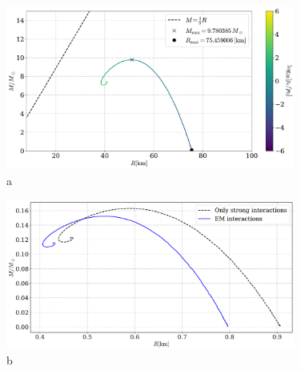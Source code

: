 \begin{figure}[!htb]
    \centering
    \includegraphics[width=0.85\textwidth]{../scripts/figurer/pion_star/mass_radius_pion_star_EM.pdf}
    \caption{a }
    \label{fig: mass radius relation leading order pion star with em interaction}
\end{figure}


\begin{figure}[!htb]
    \centering
    \includegraphics[width=0.85\textwidth]{../scripts/figurer/pion_star/mass_radius_pion_star_compare.pdf}
    \caption{b
        }
        \label{fig: mass radius relation comparison}
\end{figure}
